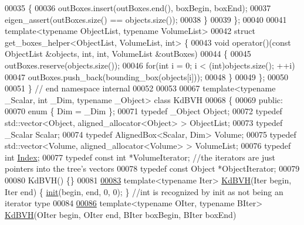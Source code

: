 \begin{DoxyCode}
00035   \{
00036     outBoxes.insert(outBoxes.end(), boxBegin, boxEnd);
00037     eigen\_assert(outBoxes.size() == objects.size());
00038   \}
00039 \};
00040 
00041 \textcolor{keyword}{template}<\textcolor{keyword}{typename} ObjectList, \textcolor{keyword}{typename} VolumeList>
00042 \textcolor{keyword}{struct }get\_boxes\_helper<ObjectList, VolumeList, int> \{
00043   \textcolor{keywordtype}{void} operator()(\textcolor{keyword}{const} ObjectList &objects, \textcolor{keywordtype}{int}, \textcolor{keywordtype}{int}, VolumeList &outBoxes)
00044   \{
00045     outBoxes.reserve(objects.size());
00046     \textcolor{keywordflow}{for}(\textcolor{keywordtype}{int} i = 0; i < (int)objects.size(); ++i)
00047       outBoxes.push\_back(bounding\_box(objects[i]));
00048   \}
00049 \};
00050 
00051 \} \textcolor{comment}{// end namespace internal}
00052 
00053 
00067 \textcolor{keyword}{template}<\textcolor{keyword}{typename} \_Scalar, \textcolor{keywordtype}{int} \_Dim, \textcolor{keyword}{typename} \_Object> \textcolor{keyword}{class }KdBVH
00068 \{
00069 \textcolor{keyword}{public}:
00070   \textcolor{keyword}{enum} \{ Dim = \_Dim \};
00071   \textcolor{keyword}{typedef} \_Object Object;
00072   \textcolor{keyword}{typedef} std::vector<Object, aligned\_allocator<Object> > ObjectList;
00073   \textcolor{keyword}{typedef} \_Scalar Scalar;
00074   \textcolor{keyword}{typedef} AlignedBox<Scalar, Dim> Volume;
00075   \textcolor{keyword}{typedef} std::vector<Volume, aligned\_allocator<Volume> > VolumeList;
00076   \textcolor{keyword}{typedef} \textcolor{keywordtype}{int} \hyperlink{namespace_eigen_a62e77e0933482dafde8fe197d9a2cfde}{Index};
00077   \textcolor{keyword}{typedef} \textcolor{keyword}{const} \textcolor{keywordtype}{int} *VolumeIterator; \textcolor{comment}{//the iterators are just pointers into the tree's vectors}
00078   \textcolor{keyword}{typedef} \textcolor{keyword}{const} Object *ObjectIterator;
00079 
00080   KdBVH() \{\}
00081 
\hyperlink{class_eigen_1_1_kd_b_v_h_a87d240e2d6ac5e87fc2e4ae6e0fe4bdc}{00083}   \textcolor{keyword}{template}<\textcolor{keyword}{typename} Iter> \hyperlink{class_eigen_1_1_kd_b_v_h_a87d240e2d6ac5e87fc2e4ae6e0fe4bdc}{KdBVH}(Iter begin, Iter end) \{ \hyperlink{structinit}{init}(begin, end, 0, 0); \} \textcolor{comment}{//int is
       recognized by init as not being an iterator type}
00084 
\hyperlink{class_eigen_1_1_kd_b_v_h_a94f781127eeec80a7659b8a625e2fa94}{00086}   \textcolor{keyword}{template}<\textcolor{keyword}{typename} OIter, \textcolor{keyword}{typename} BIter> \hyperlink{class_eigen_1_1_kd_b_v_h_a94f781127eeec80a7659b8a625e2fa94}{KdBVH}(OIter begin, OIter end, BIter boxBegin, BIter boxEnd)

\end{DoxyCode}

